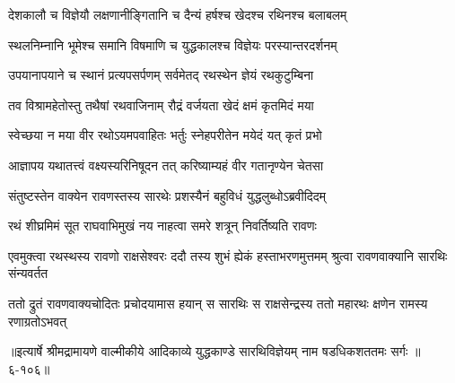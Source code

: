 \twolineshloka
{देशकालौ च विज्ञेयौ लक्षणानीङ्गितानि च}
{दैन्यं हर्षश्च खेदश्च रथिनश्च बलाबलम्} %

\twolineshloka
{स्थलनिम्नानि भूमेश्च समानि विषमाणि च}
{युद्धकालश्च विज्ञेयः परस्यान्तरदर्शनम्} %

\twolineshloka
{उपयानापयाने च स्थानं प्रत्यपसर्पणम्}
{सर्वमेतद् रथस्थेन ज्ञेयं रथकुटुम्बिना} %

\twolineshloka
{तव विश्रामहेतोस्तु तथैषां रथवाजिनाम्}
{रौद्रं वर्जयता खेदं क्षमं कृतमिदं मया} %

\twolineshloka
{स्वेच्छया न मया वीर रथोऽयमपवाहितः}
{भर्तुः स्नेहपरीतेन मयेदं यत् कृतं प्रभो} %

\twolineshloka
{आज्ञापय यथातत्त्वं वक्ष्यस्यरिनिषूदन}
{तत् करिष्याम्यहं वीर गतानृण्येन चेतसा} %

\twolineshloka
{संतुष्टस्तेन वाक्येन रावणस्तस्य सारथेः}
{प्रशस्यैनं बहुविधं युद्धलुब्धोऽब्रवीदिदम्} %

\twolineshloka
{रथं शीघ्रमिमं सूत राघवाभिमुखं नय}
{नाहत्वा समरे शत्रून् निवर्तिष्यति रावणः} %

\threelineshloka
{एवमुक्त्वा रथस्थस्य रावणो राक्षसेश्वरः}
{ददौ तस्य शुभं ह्येकं हस्ताभरणमुत्तमम्}
{श्रुत्वा रावणवाक्यानि सारथिः संन्यवर्तत} %

\twolineshloka
{ततो द्रुतं रावणवाक्यचोदितः प्रचोदयामास हयान् स सारथिः}
{स राक्षसेन्द्रस्य ततो महारथः क्षणेन रामस्य रणाग्रतोऽभवत्} %


॥इत्यार्षे श्रीमद्रामायणे वाल्मीकीये आदिकाव्ये युद्धकाण्डे सारथिविज्ञेयम् नाम षडधिकशततमः सर्गः ॥६-१०६॥
